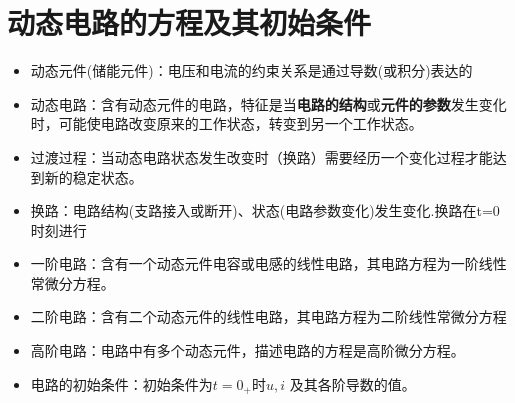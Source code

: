 \documentclass[11pt,a4paper,oneside]{book}
\begin{document}
\section{动态电路的方程及其初始条件}

\begin{itemize}
	\item 动态元件(储能元件)：电压和电流的约束关系是通过导数(或积分)表达的  
	\item 动态电路：含有动态元件的电路，特征是当\textbf{电路的结构}或\textbf{元件的参数}发生变化时，可能使电路改变原来的工作状态，转变到另一个工作状态。
	\item 过渡过程：当动态电路状态发生改变时（换路）需要经历一个变化过程才能达到新的稳定状态。
	\item 换路：电路结构(支路接入或断开)、状态(电路参数变化)发生变化.换路在t=0时刻进行
	\item 一阶电路：含有一个动态元件电容或电感的线性电路，其电路方程为一阶线性常微分方程。
	\item 二阶电路：含有二个动态元件的线性电路，其电路方程为二阶线性常微分方程
	\item 高阶电路：电路中有多个动态元件，描述电路的方程是高阶微分方程。
	\item 电路的初始条件：初始条件为$t=0_+$时$u,i$ 及其各阶导数的值。
\end{itemize}
\end{document}
